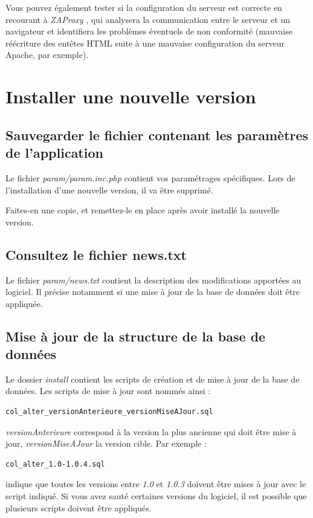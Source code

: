 Vous pouvez également tester si la configuration du serveur est correcte en recourant à \textit{ZAProxy} \cite{zaproxy}, qui analysera la communication entre le serveur et un navigateur et identifiera les problèmes éventuels de non conformité (mauvaise réécriture des entêtes HTML suite à une mauvaise configuration du serveur Apache, par exemple).

\section{Installer une nouvelle version}

\subsection{Sauvegarder le fichier contenant les paramètres de l'application}

Le fichier \textit{param/param.inc.php} contient vos paramétrages spécifiques. Lors de l'installation d'une nouvelle version, il va être supprimé.

Faites-en une copie, et remettez-le en place après avoir installé la nouvelle version.

\subsection{Consultez le fichier news.txt}

Le fichier \textit{param/news.txt} contient la description des modifications apportées au logiciel. Il précise notamment si une mise à jour de la base de données doit être appliquée.

\subsection{Mise à jour de la structure de la base de données}

Le dossier \textit{install} contient les scripts de création et de mise à jour de la base de données. Les scripts de mise à jour sont nommés ainsi :
\begin{lstlisting}
col_alter_versionAnterieure_versionMiseAJour.sql
\end{lstlisting}

\textit{versionAnterieure} correspond à la version la plus ancienne qui doit être mise à jour, \textit{versionMiseAJour} la version cible. Par exemple :
\begin{lstlisting}
col_alter_1.0-1.0.4.sql
\end{lstlisting}
indique que toutes les versions entre \textit{1.0} et \textit{1.0.3} doivent être mises à jour avec le script indiqué. Si vous avez \og sauté \fg{} certaines versions du logiciel, il est possible que plusieurs scripts doivent être appliqués.

